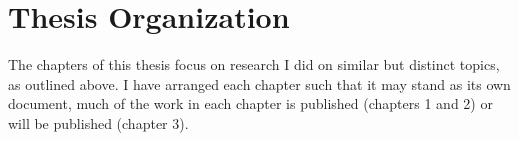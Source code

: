\section{Thesis Organization}
The chapters of this thesis focus on research I did on similar but distinct topics, as outlined above. I have arranged each chapter such that it may stand as its own document, much of the work in each chapter is published (chapters 1 and 2) or will be published (chapter 3).  
